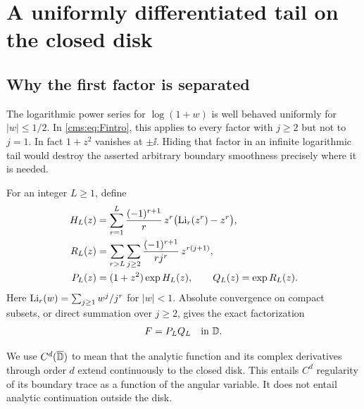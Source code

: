 \section{A uniformly differentiated tail on the closed disk}\label{cms:sec:tail}
\subsection{Why the first factor is separated}
The logarithmic power series for $\log(1+w)$ is well behaved uniformly for $|w|\leq1/2$. In \eqref{cms:eq:Fintro}, this applies to every factor with $j\geq2$ but not to $j=1$. In fact $1+z^2$ vanishes at $\pm\ii$. Hiding that factor in an infinite logarithmic tail would destroy the asserted arbitrary boundary smoothness precisely where it is needed.

For an integer $L\geq1$, define
\begin{align}\label{cms:eq:HL}
H_L(z)&=\sum_{r=1}^{L}\frac{(-1)^{r+1}}r\,
 z^r\bigl(\operatorname{Li}_r(z^r)-z^r\bigr),\\
R_L(z)&=\sum_{r>L}\sum_{j\geq2}
 \frac{(-1)^{r+1}}{rj^r}\,z^{r(j+1)},\notag\\
P_L(z)&=(1+z^2)\exp H_L(z),\qquad Q_L(z)=\exp R_L(z).\notag
\end{align}
Here $\operatorname{Li}_r(w)=\sum_{j\geq1}w^j/j^r$ for $|w|<1$. Absolute convergence on compact subsets, or direct summation over $j\geq2$, gives the exact factorization
\begin{equation}\label{cms:eq:factorization}
F=P_LQ_L\quad\hbox{in }\mathbb D.
\end{equation}

We use $C^d(\overline{\mathbb D})$ to mean that the analytic function and its complex derivatives through order $d$ extend continuously to the closed disk. This entails $C^d$ regularity of its boundary trace as a function of the angular variable. It does not entail analytic continuation outside the disk.

